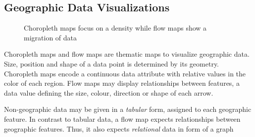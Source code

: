 \subsection{Geographic Data Visualizations}

\begin{figure}
  \centering
    \qquad
    \caption{Choropleth maps focus on a density while flow maps show a migration of data}%
    \label{fig:analysis:geographical}
\end{figure}

Choropleth maps and flow maps are thematic maps to visualize geographic data.
Size, position and shape of a data point is determined by its geometry.
Choropleth maps encode a continuous data attribute with relative values in the color of each region.
Flow maps may display relationships between features, a data value defining the size, colour, direction or shape of each arrow.

Non-geographic data may be given in a \emph{tabular} form, assigned to each geographic feature.
In contrast to tabular data, a flow map expects relationships between geographic features.
Thus, it also expects \emph{relational} data in form of a graph


